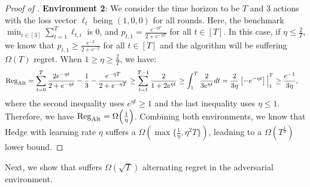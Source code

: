 \begin{proof}[Proof of ]
\textbf{Environment 2}: We consider the time horizon to be $T$ and $3$ actions with the loss vector $\ell_t$ being $(1,0,0)$ for all rounds. Here, the benchmark $\min_{i\in[3]} \sum_{t=1}^T \ell_{t,i} $ is $0$, and $p_{t,1}=\frac{e^{-\eta T}}{2+e^{-\eta T}}$ for all $t\in[T]$. In this case, if $\eta\leq \frac{2}{T}$, we know that $p_{t,1}\geq \frac{e^{-2}}{2+e^{-2}}$ for all $t\in [T]$ and the algorithm will be suffering $\Omega(T)$ regret. When $1\geq \eta\geq \frac{2}{T}$, we have:
\begin{align*}
    \mathrm{Reg}_{\mathrm{Alt}} &= \sum_{t=0}^T \frac{2e^{-\eta t}}{2+e^{-\eta t}} - \frac{1}{3} -\frac{e^{-\eta T}}{2+e^{-\eta T}} \ge \sum_{t=1}^{T-1} \frac{2}{1+2e^{\eta t}}\ge \int_{1}^{T} \frac{2}{3e^{\eta t}}dt= \frac{2}{3\eta}\left[-e^{-\eta t}\right]\Big|_{1}^{T}\ge\frac{e^{-1}}{3\eta},
\end{align*}
where the second inequality uses $e^{\eta t}\geq 1$ and the last inequality uses $\eta\leq 1$.
Therefore, we have $\mathrm{Reg}_{\mathrm{Alt}} = \Omega\Big(\frac{1}{\eta}\Big)$. Combining both environments, we know that Hedge with learning rate $\eta$ suffers a $\Omega(\max\{\frac{1}{\eta},\eta^2 T\})$, leadning to a $\Omega(T^{\frac{1}{3}})$ lower bound.
\end{proof}


Next, we show that \PRM suffers $\Omega(\sqrt{T})$ alternating regret in the adversarial environment.

